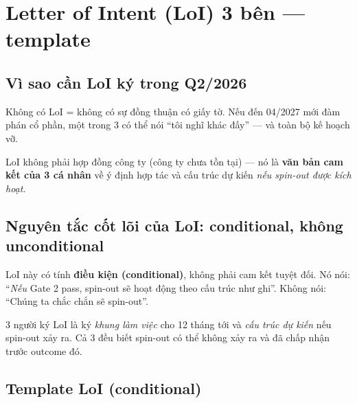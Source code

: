 \documentclass[11pt,a4paper]{article}
\begin{document}
\clearpage

\section{Letter of Intent (LoI) 3 bên — template}

\subsection{Vì sao cần LoI ký trong Q2/2026}

Không có LoI = không có sự đồng thuận có giấy tờ. Nếu đến 04/2027 mới đàm phán
cổ phần, một trong 3 có thể nói ``tôi nghĩ khác đấy'' --- và toàn bộ kế hoạch
vỡ.

LoI không phải hợp đồng công ty (công ty chưa tồn tại) --- nó là \textbf{văn
bản cam kết của 3 cá nhân} về ý định hợp tác và cấu trúc dự kiến \textit{nếu
spin-out được kích hoạt}.

\subsection{Nguyên tắc cốt lõi của LoI: conditional, không unconditional}

\begin{warnbox}[title=Đọc kỹ trước khi ký]
LoI này có tính \textbf{điều kiện (conditional)}, không phải cam kết tuyệt đối. Nó
nói: ``\textit{Nếu} Gate 2 pass, spin-out sẽ hoạt động theo cấu trúc như ghi''.
Không nói: ``Chúng ta chắc chắn sẽ spin-out''.

3 người ký LoI là ký \textit{khung làm việc} cho 12 tháng tới và \textit{cấu
trúc dự kiến} nếu spin-out xảy ra. Cả 3 đều biết spin-out có thể không xảy ra
và đã chấp nhận trước outcome đó.
\end{warnbox}

\subsection{Template LoI (conditional)}
\end{document}

